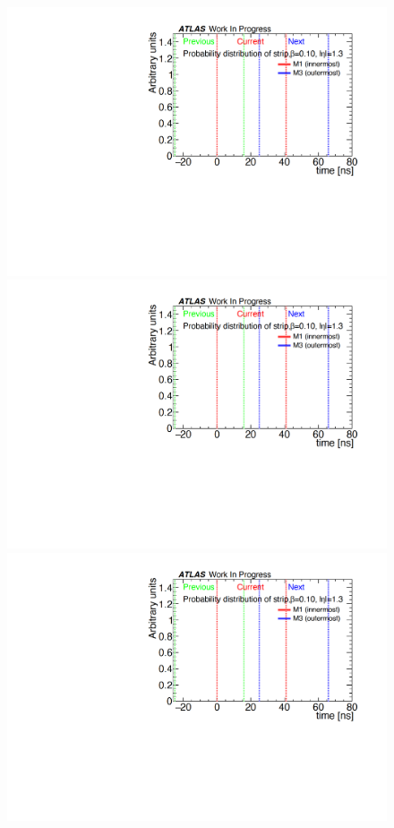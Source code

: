\begin{figure}[H]
    \begin{minipage}{0.33\hsize}
    \centering   
    \includegraphics[width=\textwidth,page=11]{img/rec/rec_e1.3_s.pdf}
    \subcaption{}
    \end{minipage}
    \begin{minipage}{0.33\hsize}
    \centering   
    \includegraphics[width=\textwidth,page=9]{img/rec/rec_e1.3_s.pdf}
    \subcaption{}
    \end{minipage}
    \begin{minipage}{0.33\hsize}
    \centering   
    \includegraphics[width=\textwidth,page=7]{img/rec/rec_e1.3_s.pdf}

\end{minipage}
\end{figure}
